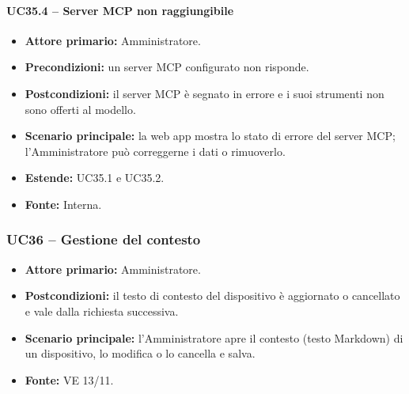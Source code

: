 \documentclass[12pt,a4paper]{article}
\newcommand{\tightlist}{\setlength{\itemsep}{1pt}\setlength{\parskip}{0pt}}
\begin{document}
\paragraph{UC35.4 -- Server MCP non raggiungibile}

\begin{itemize}

\tightlist

\item \textbf{Attore primario:} Amministratore.

\item \textbf{Precondizioni:} un server MCP configurato non risponde.

\item \textbf{Postcondizioni:} il server MCP è segnato in errore e i suoi strumenti non sono offerti al modello.

\item \textbf{Scenario principale:} la web app mostra lo stato di errore del server MCP; l'Amministratore può correggerne i dati o rimuoverlo.

\item \textbf{Estende:} UC35.1 e UC35.2.

\item \textbf{Fonte:} Interna.

\end{itemize}



\subsubsection{UC36 -- Gestione del contesto}

\begin{itemize}

\tightlist

\item \textbf{Attore primario:} Amministratore.

\item \textbf{Postcondizioni:} il testo di contesto del dispositivo è aggiornato o cancellato e vale dalla richiesta successiva.

\item \textbf{Scenario principale:} l'Amministratore apre il contesto (testo Markdown) di un dispositivo, lo modifica o lo cancella e salva.

\item \textbf{Fonte:} VE 13/11.

\end{itemize}
\end{document}
